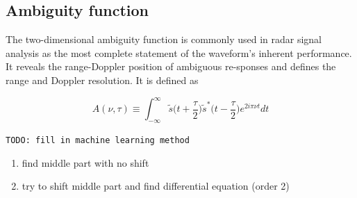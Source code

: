 \subsection{Ambiguity function}
The two-dimensional ambiguity function is commonly used in radar signal  analysis as the most complete statement of the waveform's inherent performance. It reveals the range-Doppler position of ambiguous re-sponses and defines the range and Doppler resolution. It is defined as 

\begin{equation}
A(\nu,\tau)\equiv\int_{-\infty}^{\infty}\tilde{s}\big(t+\frac{\tau}{2}\big)\tilde{s}^*\big(t-\frac{\tau}{2}\big)e^{2i\pi\nu t} dt
\end{equation}

\texttt{TODO: fill in machine learning method}

\begin{enumerate}
	\item find middle part with no shift
	\item try to shift middle part and find differential equation (order 2)
\end{enumerate}
 